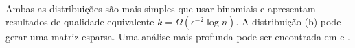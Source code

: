 \paragraph{} Ambas as distribuições são mais simples que usar binomiais e apresentam resultados de qualidade equivalente $k = \Omega(\epsilon^{-2}\log{n})$. A distribuição (b) pode gerar uma matriz esparsa. Uma análise mais profunda pode ser encontrada em \cite{achlioptas_2003}
e \cite{bingham_2001}.